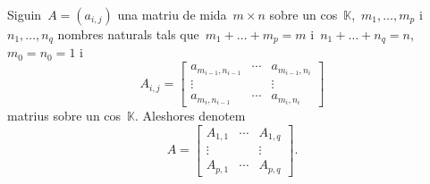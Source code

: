 \documentclass[../../main.tex]{subfiles}
\begin{document}
    \begin{notation}
        Siguin~\(A=(a_{i,j})\) una matriu de mida~\(m\times n\) sobre un cos~\(\mathbb{K}\),~\(m_{1},\dots,m_{p}\) i~\(n_{1},\dots,n_{q}\) nombres naturals tals que~\(m_{1}+\dots+m_{p}=m\) i~\(n_{1}+\dots+n_{q}=n\),~\(m_{0}=n_{0}=1\) i
        \[A_{i,j}=\left[\begin{matrix}
        a_{m_{i-1},n_{i-1}} & \cdots & a_{m_{i-1},n_{i}}\\
        \vdots & & \vdots \\
        a_{m_{i},n_{i-1}} & \cdots & a_{m_{i},n_{i}}
        \end{matrix}\right]\]
        matrius sobre un cos~\(\mathbb{K}\).
        Aleshores denotem
        \[A=\left[\begin{matrix}
        A_{1,1} & \cdots & A_{1,q} \\
        \vdots & & \vdots \\
        A_{p,1} & \cdots & A_{p,q}
        \end{matrix}\right].\]
    \end{notation}
\end{document}
